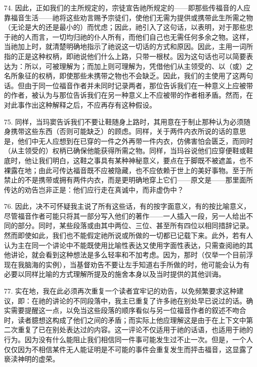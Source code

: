 74. 因此，正如我们的主所规定的，宗徒宣告祂所规定的——即那些传福音的人应靠福音生活——祂将这些劝言赐予宗徒们，使他们无需为提供或携带此生所需之物（无论是大的还是最小的）而忧虑；因此，祂引入了这句话，以表明，对于那些忠于祂的人而言，一切均归祂的仆人所有，而他们自己也无需任何多余之物。这样，当祂加上时，就清楚明确地指示了祂说这一切话的方式和原因。因此，主用一词所指的正是这种权柄，即祂说他们什么上路，只带一根杖。因为这句话也可以简要表达为：所以，可被理解为；而加上则可理解为，凭借他们从主领受的、以（或）之名所象征的权柄，即使那些未携带之物也不会缺乏。因此，我们的主使用了这两句话。但由于同一位福音作者并未同时记录两者，那位告诉我们在一种意义上应被带的作者，被认为与那位告诉我们在另一种意义上不应被带的作者相矛盾。然而，在对此事作出这种解释之后，不应再存有这种假设。\par

75. 同样，当玛窦告诉我们不要让鞋随身上路时，其用意在于制止那种认为必须随身携带这些东西（否则可能缺乏）的顾虑。同样，关于两件内衣所说的话的意思是，他们中无人应想到在已穿的一件之外再带一件内衣，仿佛害怕会匮乏，而同时（从主领受的）权柄已确保他能获得所需之物。同样，当玛谷说他们应穿便鞋或鞋底时，他让我们明白，这鞋之事具有某种神秘意义，要点在于脚既不被遮盖，也不裸露在地；由此可传达福音既不应被隐藏，也不应依赖于世上的美好事物。至于所禁止的不是携带或拥有两件内衣，而是更明确地穿上它们——原文是——那里面所传达的劝告岂非正是：他们应行走在真诚中，而非虚伪中？\par

76. 因此，决不可怀疑我主说了所有这些话，有的按字面意义，有的按比喻意义，尽管福音作者可能只将其一部分写入他们的著作——一人插入一段，另一人给出不同的部分。同时，某些段落或由其中两位、三位、甚至所有四位以相同措辞记录。然而即使如此，我们也不能假定祂所说或所做的一切都已记载下来。此外，若有人认为主在同一个讲论中不能既使用比喻性表达又使用字面性表达，只需查阅祂的其他讲论，就会看到这种想法是多么轻率和不加考虑。因为，那时（仅举一个目前浮现在我脑海的实例），当基督劝告不要让左手知道右手所做的时，他可能会认为有必要以同样比喻的方式理解所提及的施舍本身以及当时提供的其他训诲。\par

77. 实在地，我在此必须再次重复一个读者宜牢记的劝告，以免频繁要求这种建议，即：在祂的讲论的不同段落中，我主已重复了许多祂在别处早已说过的话。确实需要提醒这一点，以免当这些段落的顺序看似与另一位福音作者的叙述不吻合时，读者臆想这构成了他们之间的矛盾；而实际上他应理解这是由于在上下文中第二次重复了已在别处表达过的内容。这一评论不仅适用于祂的话语，也适用于祂的行为。因为没有什么能阻止我们相信同一件事可能发生过不止一次。但是，一个人仅仅因为不相信某件无人能证明是不可能的事件会重复发生而抨击福音，这显露了亵渎神明的虚荣。\par

